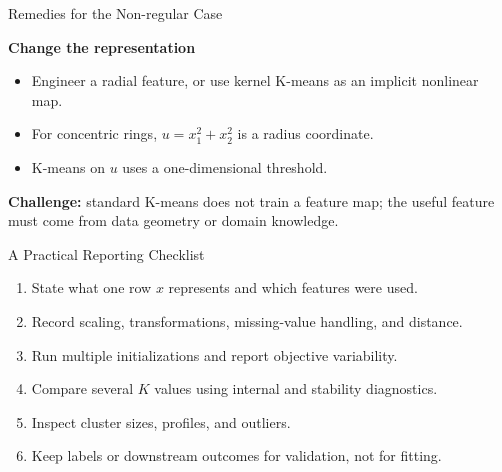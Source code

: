 \begin{frame}{Remedies for the Non-regular Case}

      \textbf{Change the representation}
      \begin{itemize}\setlength{\itemsep}{.3cm}
        \item Engineer a radial feature, or use kernel K-means as an implicit nonlinear map.
        \item For concentric rings, $u=x_1^2+x_2^2$ is a radius coordinate.
        \item K-means on $u$ uses a one-dimensional threshold.
      \end{itemize}

  \vspace{.2cm}
  {\scriptsize\color{slideorange}\textbf{Challenge:} standard K-means does not train a feature map; the useful feature must come from data geometry or domain knowledge.}
\end{frame}



\begin{frame}{A Practical Reporting Checklist}
  \begin{enumerate}\spaceditems
    \item State what one row $x$ represents and which features were used.
    \item Record scaling, transformations, missing-value handling, and distance.
    \item Run multiple initializations and report objective variability.
    \item Compare several $K$ values using internal and stability diagnostics.
    \item Inspect cluster sizes, profiles, and outliers.
    \item Keep labels or downstream outcomes for validation, not for fitting.
  \end{enumerate}
\end{frame}
